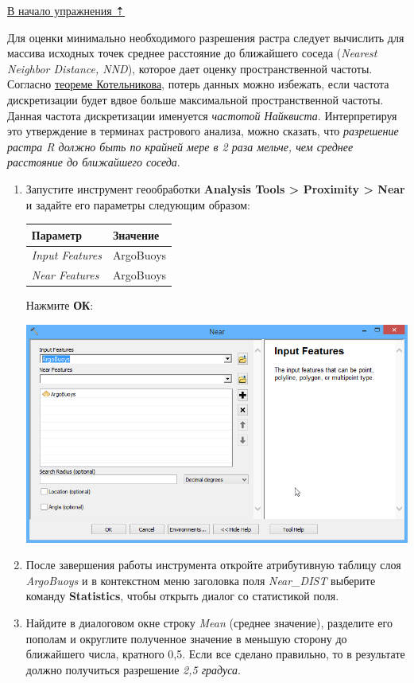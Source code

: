 \documentclass[12pt,]{book}
\begin{document}
\protect\hyperlink{interpolation}{В начало упражнения ⇡}

Для оценки минимально необходимого разрешения растра следует вычислить для массива исходных точек среднее расстояние до ближайшего соседа (\emph{Nearest Neighbor Distance, NND}), которое дает оценку пространственной частоты. Согласно \href{https://ru.wikipedia.org/wiki/Теорема_Котельникова}{теореме Котельникова}, потерь данных можно избежать, если частота дискретизации будет вдвое больше максимальной пространственной частоты. Данная частота дискретизации именуется \emph{частотой Найквиста}. Интерпретируя это утверждение в терминах растрового анализа, можно сказать, что \emph{разрешение растра R должно быть по крайней мере в 2 раза мельче, чем среднее расстояние до ближайшего соседа}.

\begin{enumerate}
\def\labelenumi{\arabic{enumi}.}
\item
  Запустите инструмент геообработки \textbf{Analysis Tools \textgreater{} Proximity \textgreater{} Near} и задайте его параметры следующим образом:

  \begin{longtable}[]{@{}ll@{}}
  \toprule
  Параметр & Значение\tabularnewline
  \midrule
  \endhead
  \emph{Input Features} & ArgoBuoys\tabularnewline
  \emph{Near Features} & ArgoBuoys\tabularnewline
  \bottomrule
  \end{longtable}

  Нажмите \textbf{ОК}:

  \includegraphics{images/Ex17/image8.png}
\item
  После завершения работы инструмента откройте атрибутивную таблицу слоя \emph{ArgoBuoys} и в контекстном меню заголовка поля \emph{Near\_DIST} выберите команду \textbf{Statistics}, чтобы открыть диалог со статистикой поля.
\item
  Найдите в диалоговом окне строку \emph{Mean} (среднее значение), разделите его пополам и округлите полученное значение в меньшую сторону до ближайшего числа, кратного 0,5. Если все сделано правильно, то в результате должно получиться разрешение \emph{2,5 градуса}.
\end{enumerate}
\end{document}
